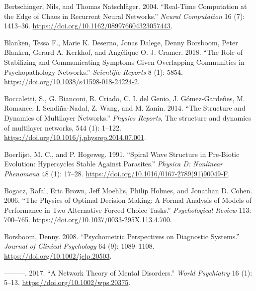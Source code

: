 \documentclass[
  letterpaper,
]{scrbook}
\newlength{\cslhangindent}
\newlength{\cslentryspacingunit} %
\newenvironment{CSLReferences}[2] %
 {%
  \setlength{\parindent}{0pt}
  \ifodd #1
  \let\oldpar\par
  \def\par{\hangindent=\cslhangindent\oldpar}
  \fi
  \setlength{\parskip}{#2\cslentryspacingunit}
 }%
 {}
\begin{document}
\begin{CSLReferences}{1}{0}
\leavevmode{}%
Bertschinger, Nils, and Thomas Natschläger. 2004. {``Real-{Time
Computation} at the {Edge} of {Chaos} in {Recurrent Neural Networks}.''}
\emph{Neural Computation} 16 (7): 1413--36.
\url{https://doi.org/10.1162/089976604323057443}.

\leavevmode{}%
Blanken, Tessa F., Marie K. Deserno, Jonas Dalege, Denny Borsboom, Peter
Blanken, Gerard A. Kerkhof, and Angélique O. J. Cramer. 2018. {``The
Role of Stabilizing and Communicating Symptoms Given Overlapping
Communities in Psychopathology Networks.''} \emph{Scientific Reports} 8
(1): 5854. \url{https://doi.org/10.1038/s41598-018-24224-2}.

\leavevmode{}%
Boccaletti, S., G. Bianconi, R. Criado, C. I. del Genio, J.
Gómez-Gardeñes, M. Romance, I. Sendiña-Nadal, Z. Wang, and M. Zanin.
2014. {``The Structure and Dynamics of Multilayer Networks.''}
\emph{Physics Reports}, The structure and dynamics of multilayer
networks, 544 (1): 1--122.
\url{https://doi.org/10.1016/j.physrep.2014.07.001}.

\leavevmode{}%
Boerlijst, M. C., and P. Hogeweg. 1991. {``Spiral Wave Structure in
Pre-Biotic Evolution: {Hypercycles} Stable Against Parasites.''}
\emph{Physica D: Nonlinear Phenomena} 48 (1): 17--28.
\url{https://doi.org/10.1016/0167-2789(91)90049-F}.

\leavevmode{}%
Bogacz, Rafal, Eric Brown, Jeff Moehlis, Philip Holmes, and Jonathan D.
Cohen. 2006. {``The Physics of Optimal Decision Making: {A} Formal
Analysis of Models of Performance in Two-Alternative Forced-Choice
Tasks.''} \emph{Psychological Review} 113: 700--765.
\url{https://doi.org/10.1037/0033-295X.113.4.700}.

\leavevmode{}%
Borsboom, Denny. 2008. {``Psychometric Perspectives on Diagnostic
Systems.''} \emph{Journal of Clinical Psychology} 64 (9): 1089--1108.
\url{https://doi.org/10.1002/jclp.20503}.

\leavevmode{}%
---------. 2017. {``A Network Theory of Mental Disorders.''} \emph{World
Psychiatry} 16 (1): 5--13. \url{https://doi.org/10.1002/wps.20375}.


\end{CSLReferences}
\end{document}
